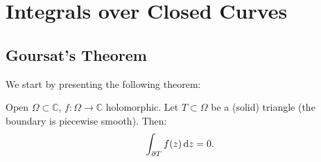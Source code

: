 \setcounter{section}{0}
\setcounter{theorem}{0}



\section{Integrals over Closed Curves}
\subsection{Goursat's Theorem}
We start by presenting the following theorem:


\begin{theorem} \label{thm:goursat}
Open $\Omega \subset \mathbb{C}$, $f: \Omega \rightarrow \mathbb{C}$ holomorphic. Let $T\subset \Omega$ be a (solid) triangle (the boundary is piecewise smooth). Then:
\begin{align*}
    \int_{\partial T} f(z)  \dif z =0.
\end{align*}

\end{theorem}


